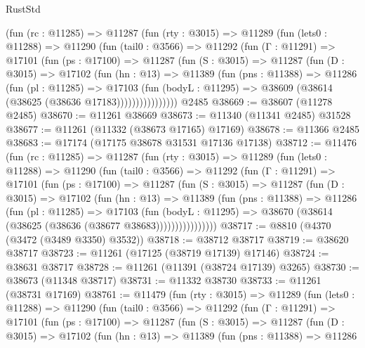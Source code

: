 \begin{lexlean}{RustStd}
\begin{coremodule}
      (fun (rc : @11285) =>
      @11287
        (fun (rty : @3015) =>
        @11289
          (fun (lets0 : @11288) =>
          @11290
            (fun (tail0 : @3566) =>
            @11292
              (fun (Γ : @11291) =>
              @17101
                (fun (ps : @17100) =>
                @11287
                  (fun (S : @3015) =>
                  @11287
                    (fun (D : @3015) =>
                    @17102
                      (fun (hn : @13) =>
                      @11389
                        (fun (pns : @11388) =>
                        @11286
                          (fun (pl : @11285) =>
                          @17103
                            (fun (bodyL : @11295) =>
                            @38609 (@38614 (@38625 (@38636 @17183))))))))))))))))
    @2485
@38669 := @38607 (@11278 @2485)
@38670 := @11261 @38669
@38673 := @11340 (@11341 @2485) @31528
@38677 := @11261 (@11332 (@38673 @17165) @17169)
@38678 := @11366 @2485
@38683 := @17174 (@17175 @38678 @31531 @17136 @17138)
@38712 := @11476
    (fun (rc : @11285) =>
    @11287
      (fun (rty : @3015) =>
      @11289
        (fun (lets0 : @11288) =>
        @11290
          (fun (tail0 : @3566) =>
          @11292
            (fun (Γ : @11291) =>
            @17101
              (fun (ps : @17100) =>
              @11287
                (fun (S : @3015) =>
                @11287
                  (fun (D : @3015) =>
                  @17102
                    (fun (hn : @13) =>
                    @11389
                      (fun (pns : @11388) =>
                      @11286
                        (fun (pl : @11285) =>
                        @17103
                          (fun (bodyL : @11295) =>
                          @38670 (@38614 (@38625 (@38636 (@38677 @38683))))))))))))))))
@38717 := @8810 (@4370 (@3472 (@3489 @3350) @3532))
@38718 := @38712 @38717
@38719 := @38620 @38717
@38723 := @11261 (@17125 (@38719 @17139) @17146)
@38724 := @38631 @38717
@38728 := @11261 (@11391 (@38724 @17139) @3265)
@38730 := @38673 (@11348 @38717)
@38731 := @11332 @38730
@38733 := @11261 (@38731 @17169)
@38761 := @11479
    (fun (rty : @3015) =>
    @11289
      (fun (lets0 : @11288) =>
      @11290
        (fun (tail0 : @3566) =>
        @11292
          (fun (Γ : @11291) =>
          @17101
            (fun (ps : @17100) =>
            @11287
              (fun (S : @3015) =>
              @11287
                (fun (D : @3015) =>
                @17102
                  (fun (hn : @13) =>
                  @11389
                    (fun (pns : @11388) =>
                    @11286

\end{coremodule}
\end{lexlean}
